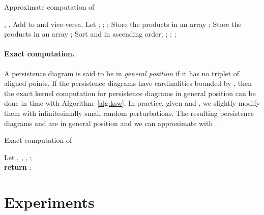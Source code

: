 \documentclass[11pt]{article}
\begin{document}
\begin{algorithm}
\caption{Approximate computation of }
\label{alg:aksw}
\begin{algorithmic}
 , .
\STATE Add  to  and vice-versa.
\STATE Let ; ; ;
\FOR{}
	\STATE Store the products  in an array ;
	\STATE Store the
 products  in an array ;
	\STATE Sort  and  in ascending order;
	\STATE ;
	\STATE ;
\ENDFOR
{} ;
\end{algorithmic}
\end{algorithm}  

\paragraph*{Exact computation.} A persistence diagram is said to be in {\em general position} if it has no triplet of aligned points.  
If the persistence diagrams have cardinalities bounded by , then the exact kernel computation for persistence diagrams in general position can be done in  time with 
Algorithm~\ref{alg:ksw}. In practice, given  and , we slightly modify them with infinitesimally small random perturbations. The resulting persistence diagrams 
 and  are in general position and we can approximate
 with .	

\begin{algorithm}
\caption{Exact computation of }\label{alg:ksw}
Let , , , ;\\
{\bf{\text return }};
\end{algorithm}  



\section{Experiments}
\label{sec:expe}
\end{document}
